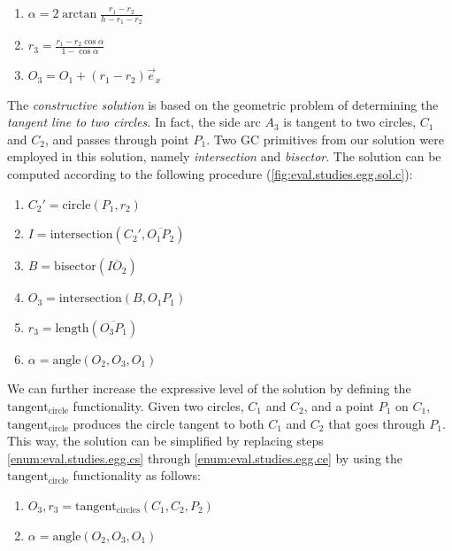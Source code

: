 \begin{enumerate}
  \item $\alpha = 2\arctan\frac{r_1 - r_2}{h - r_1 - r_2}$
  \item $r_3 = \frac{r_1 - r_2 \cos\alpha}{1 - \cos\alpha}$
  \item $O_3 = O_1 + \left(r_1 - r_2\right)\vec{e}_x$
\end{enumerate}

The \textit{constructive solution} is based on the geometric problem of
determining the \textit{tangent line to two circles}.  In fact, the side arc
$A_3$ is tangent to two circles, $C_1$ and $C_2$, and passes through point
$P_1$.  Two \ac{GC} primitives from our solution were employed in this
solution, namely \textit{intersection} and \textit{bisector}.  The solution can
be computed according to the following procedure
(\cref{fig:eval.studies.egg.sol.c}):

\begin{enumerate}
  \item $C_{2}' = \mathrm{circle}\left(P_1, r_2\right)$%
  \label{enum:eval.studies.egg.cs}
  \item $I = \mathrm{intersection}\left(C_{2}', \overline{O_1 P_2}\right)$
  \item $B = \mathrm{bisector}\left(\overline{IO_2}\right)$
  \item $O_3 = \mathrm{intersection}\left(B, O_1 P_1\right)$
  \item $r_3 = \mathrm{length}\left(\overline{O_3 P_1}\right)$%
  \label{enum:eval.studies.egg.ce}
  \item $\alpha = \mathrm{angle}\left(O_2,O_3,O_1\right)$
\end{enumerate}

We can further increase the expressive level of the solution by defining the
$\mathrm{tangent_{circle}}$ functionality.  Given two circles, $C_1$ and $C_2$,
and a point $P_1$ on $C_1$, $\mathrm{tangent_{circle}}$ produces the circle
tangent to both $C_1$ and $C_2$ that goes through $P_1$.  This way, the solution
can be simplified by replacing steps \ref{enum:eval.studies.egg.cs} through
\ref{enum:eval.studies.egg.ce} by using the $\mathrm{tangent_{circle}}$
functionality as follows:

\begin{enumerate}
  \item $O_3,r_3 = \mathrm{tangent_{circles}}\left(C_1, C_2, P_2\right)$
  \item $\alpha = \mathrm{angle}\left(O_2, O_3, O_1\right)$
\end{enumerate}

